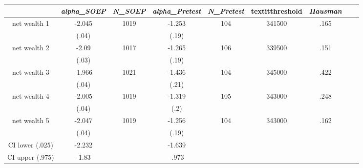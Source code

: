 \begin{tabular}{ccccccccc}
\hline \textit{}&   \textit{alpha\_SOEP}&   \textit{N\_SOEP}&       \textit{alpha\_Pretest}&        \textit{N\_Pretest}&    textit{threshold}&      \textit{Hausman}\\ \hline
net wealth 1&-2.045&1019&-1.253&104&341500&.165\\
&(.04)&&(.19)&&&\\
net wealth 2&-2.09&1017&-1.265&106&339500&.151\\
&(.03)&&(.19)&&&\\
net wealth 3&-1.966&1021&-1.436&104&345000&.422\\
&(.04)&&(.21)&&&\\
net wealth 4&-2.005&1019&-1.319&105&343000&.248\\
&(.04)&&(.2)&&&\\
net wealth 5&-2.047&1019&-1.256&104&343000&.162\\
&(.04)&&(.19)&&&\\
CI lower (.025)&-2.232&&-1.639&&&\\
CI upper (.975)&-1.83&&-.973&&&\\
\hline \end{tabular}
